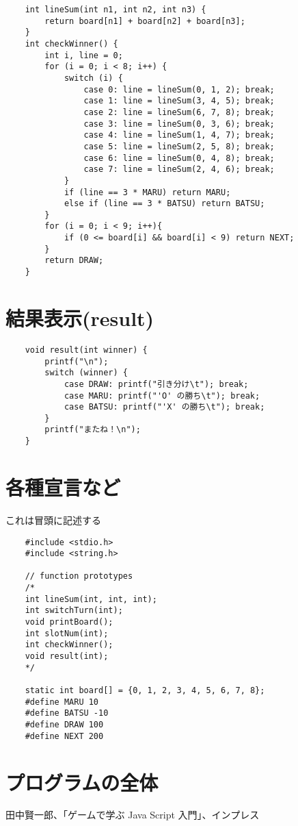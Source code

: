 \documentclass[uplatex,a4paper,11pt,oneside,openany]{jsarticle}
\begin{document}
\begin{lstlisting}
	int lineSum(int n1, int n2, int n3) {
		return board[n1] + board[n2] + board[n3];
	}
	int checkWinner() {
		int i, line = 0;
		for (i = 0; i < 8; i++) {
			switch (i) {
				case 0: line = lineSum(0, 1, 2); break;
				case 1: line = lineSum(3, 4, 5); break;
				case 2: line = lineSum(6, 7, 8); break;
				case 3: line = lineSum(0, 3, 6); break;
				case 4: line = lineSum(1, 4, 7); break;
				case 5: line = lineSum(2, 5, 8); break;
				case 6: line = lineSum(0, 4, 8); break;
				case 7: line = lineSum(2, 4, 6); break;
			}
			if (line == 3 * MARU) return MARU;
			else if (line == 3 * BATSU) return BATSU;
		}
		for (i = 0; i < 9; i++){
			if (0 <= board[i] && board[i] < 9) return NEXT;
		}
		return DRAW;
	}
\end{lstlisting}

\newpage

\section{結果表示(result)}

\begin{lstlisting}
	void result(int winner) {
		printf("\n");
		switch (winner) {
			case DRAW: printf("引き分け\t"); break;
			case MARU: printf("'O' の勝ち\t"); break;
			case BATSU: printf("'X' の勝ち\t"); break;
		}
		printf("またね！\n");
	}
\end{lstlisting}

\section{各種宣言など}

これは冒頭に記述する

\begin{lstlisting}
	#include <stdio.h>
	#include <string.h>
	
	// function prototypes
	/*
	int lineSum(int, int, int);
	int switchTurn(int);
	void printBoard();
	int slotNum(int);
	int checkWinner();
	void result(int);
	*/
	
	static int board[] = {0, 1, 2, 3, 4, 5, 6, 7, 8};
	#define MARU 10
	#define BATSU -10
	#define DRAW 100
	#define NEXT 200
\end{lstlisting}

\newpage

\section{プログラムの全体}



%
\begin{thebibliography}{99}
	 田中賢一郎、「ゲームで学ぶ Java Script 入門」、インプレス
\end{thebibliography}
%
\end{document}
